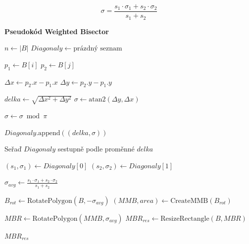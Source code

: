 \[
\sigma = \frac{s_1\cdot \sigma_1 +s_2\cdot \sigma_2}{s_1 + s_2}
\]


\textbf{Pseudokód Weighted Bisector}
\begin{algorithm}
\caption{Weighted Bisector}
\label{alg:weightedbisector}
\begin{algorithmic}[1]
\State $n \gets |B|$
    \State $Diagonaly \gets \text{prázdný seznam}$
    
            \State $p_1 \gets B[i]$
            \State $p_2 \gets B[j]$
            
            \State $\Delta x \gets p_2.x - p_1.x$
            \State $\Delta y \gets p_2.y - p_1.y$
            
            \State $delka \gets \sqrt{\Delta x^2 + \Delta y^2}$
            \State $\sigma \gets \text{atan2}(\Delta y, \Delta x)$
            
            \State $\sigma \gets \sigma \bmod \pi$ 
            
            \State $Diagonaly.\text{append}((delka, \sigma))$
        \EndFor
    \EndFor
    
    \State Seřaď $Diagonaly$ sestupně podle proměnné $delka$
    
    \State $(s_1, \sigma_1) \gets Diagonaly[0]$ 
    \State $(s_2, \sigma_2) \gets Diagonaly[1]$ 
    
    \State $\sigma_{avg} \gets \frac{s_1 \cdot \sigma_1 + s_2 \cdot \sigma_2}{s_1 + s_2}$ 
    
    \State $B_{rot} \gets \text{RotatePolygon}(B, -\sigma_{avg})$
    \State $(MMB, area) \gets \text{CreateMMB}(B_{rot})$ 
    
    \State $MBR \gets \text{RotatePolygon}(MMB, \sigma_{avg})$ 
    \State $MBR_{res} \gets \text{ResizeRectangle}(B, MBR)$ 
    
    \State \Return $MBR_{res}$
\end{algorithmic}
\end{algorithm}


